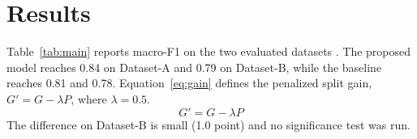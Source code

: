 \section{Results}
Table~\ref{tab:main} reports macro-F1 on the two evaluated datasets \cite{smith2024,lee2023}. The proposed model reaches 0.84 on Dataset-A and 0.79 on Dataset-B, while the baseline reaches 0.81 and 0.78. Equation~\eqref{eq:gain} defines the penalized split gain, $G' = G - \lambda P$, where $\lambda = 0.5$.
\begin{equation}
G' = G - \lambda P \label{eq:gain}
\end{equation}
The difference on Dataset-B is small (1.0 point) and no significance test was run.
